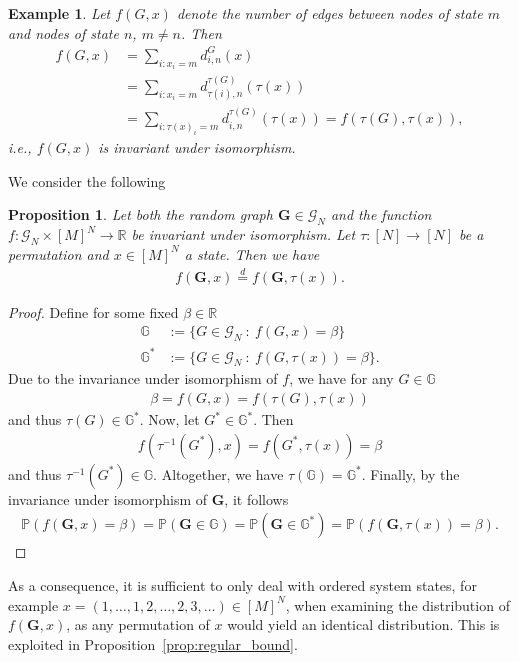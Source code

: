 \documentclass[a4paper,
               10pt,
               pdftex,
               normalheadings,
               headsepline,
               footsepline,
               headinclude,
               footinclude,
               DIV=14,
               abstracton]
{scrartcl}
\newtheorem{proposition}[theorem]{Proposition}
\newtheorem{example}[theorem]{Example}
\newcommand{\rv}[1]{\bm{#1}}
\newcommand{\set}[1]{\mathcal{#1}}
\begin{document}
\begin{example}
    Let $f(G,x)$ denote the number of edges between nodes of state $m$ and nodes of state $n$, $m\neq n$. Then
    \begin{align}
        f(G,x) &= \sum_{i : x_{i} = m} d^{G}_{i,n}(x)\\
        &= \sum_{i : x_{i} = m} d^{\tau(G)}_{\tau(i),n}(\tau(x))\\
        &= \sum_{i : \tau(x)_{i} = m} d^{\tau(G)}_{i,n}(\tau(x)) = f(\tau(G), \tau(x)),
    \end{align}
    i.e., $f(G,x)$ is invariant under isomorphism.
\end{example}

We consider the following
\begin{proposition}
Let both the random graph $\rv{G} \in \mathcal{G}_N$ and the function $f:\mathcal{G}_N \times [M]^N \to \mathbb{R}$ be invariant under isomorphism.
Let $\tau:[N]\to[N]$ be a permutation and $x \in [M]^N$ a state.
Then we have
\begin{align}
    f(\rv{G}, x) \overset{d}{=} f(\rv{G}, \tau(x)).
\end{align}
\end{proposition}
\begin{proof}
    Define for some fixed $\beta \in \mathbb{R}$
    \begin{align}
        \mathbb{G} &:= \{G \in \set{G}_N\ :\ f(G, x) = \beta\}\\
        \mathbb{G}^* &:= \{G \in \set{G}_N\ :\ f(G, \tau(x)) = \beta\}.
    \end{align}
    Due to the invariance under isomorphism of $f$, we have for any $G \in \mathbb{G}$
    \begin{align}
        \beta = f(G, x) = f(\tau(G), \tau(x))
    \end{align}
    and thus $\tau(G) \in \mathbb{G}^*$.
    Now, let $G^* \in \mathbb{G}^*$. Then
    \begin{align}
        f(\tau^{-1}(G^*), x) = f(G^*, \tau(x)) = \beta
    \end{align}
    and thus $\tau^{-1}(G^*) \in \mathbb{G}$.
    Altogether, we have $\tau(\mathbb{G}) = \mathbb{G}^*$.
    Finally, by the invariance under isomorphism of $\rv{G}$, it follows
    \begin{align}
        \mathbb{P}(f(\rv{G}, x) = \beta) = \mathbb{P}(\rv{G} \in \mathbb{G}) = \mathbb{P}(\rv{G} \in \mathbb{G}^*) = \mathbb{P}(f(\rv{G}, \tau(x)) = \beta).
    \end{align}
\end{proof}

As a consequence, it is sufficient to only deal with ordered system states, for example $x = (1,\dots,1,2,\dots,2,3,\dots) \in [M]^N$, when examining the distribution of $f(\rv{G}, x)$, as any permutation of $x$ would yield an identical distribution. This is exploited in Proposition~\ref{prop:regular_bound}.


 



\end{document}
